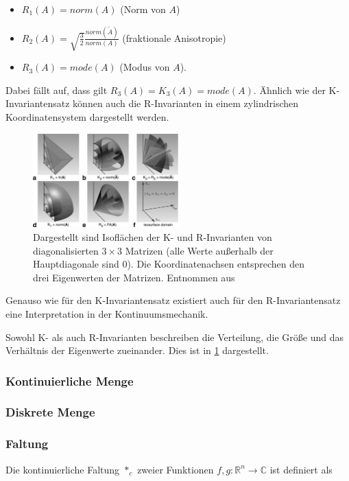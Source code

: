 \documentclass[a4paper,fontsize=12pt,toc=bib,parskip=half,ngerman]{scrartcl}
\begin{document}
\begin{itemize}
	\item $R_1(A)=norm(A)$ (Norm von $A$)
	\item $R_2(A)=\sqrt{\frac{3}{2}} \frac{norm(\tilde{A})}{norm(A)}$ (fraktionale Anisotropie)
	\item $R_3(A)=mode(A)$ (Modus von $A$).
\end{itemize}

Dabei f\"allt auf, dass gilt $R_3(A) = K_3(A) = mode(A)$. \"Ahnlich wie der K-Invariantensatz k\"onnen auch die R-Invarianten in einem zylindrischen Koordinatensystem dargestellt werden.

\begin{figure}
	\centering
	\includegraphics[width=0.5\textwidth]{pictures/000.png}
	\caption{Dargestellt sind Isofl\"achen der K- und R-Invarianten von diagonalisierten $3\times 3$ Matrizen (alle Werte au{\ss}erhalb der Hauptdiagonale sind 0). Die Koordinatenachsen entsprechen den drei Eigenwerten der Matrizen. Entnommen aus \cite[S.~139]{ennis2006orthogonal}}
	\label{KRInvariants}
\end{figure}

Genauso wie f\"ur den K-Invariantensatz existiert auch f\"ur den R-Invariantensatz eine Interpretation in der Kontinuumsmechanik. 

Sowohl K- als auch R-Invarianten beschreiben die Verteilung, die \glq Gr\"o{\ss}e\grq{} und das Verh\"altnis der Eigenwerte zueinander. Dies ist in \cref{KRInvariants} dargestellt.

\subsubsection{Kontinuierliche Menge}
\subsubsection{Diskrete Menge} 

\subsubsection{Faltung}
Die kontinuierliche Faltung $*_c$ zweier Funktionen $f,g:\mathbb{R}^n\rightarrow\mathbb{C}$ ist definiert als
\end{document}
